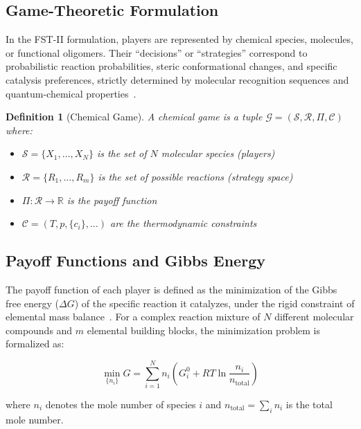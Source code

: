 \documentclass[12pt,a4paper]{article}
\newtheorem{definition}{Definition}
\theoremstyle{remark}
\begin{document}
\subsection{Game-Theoretic Formulation}

In the FST-II formulation, players are represented by chemical species, molecules, or functional oligomers. Their ``decisions'' or ``strategies'' correspond to probabilistic reaction probabilities, steric conformational changes, and specific catalysis preferences, strictly determined by molecular recognition sequences and quantum-chemical properties~\citep{ThermodynamicSelection}.

\begin{definition}[Chemical Game]
A chemical game is a tuple $\mathcal{G} = (\mathcal{S}, \mathcal{R}, \Pi, \mathcal{C})$ where:
\begin{itemize}
    \item $\mathcal{S} = \{X_1, \ldots, X_N\}$ is the set of $N$ molecular species (players)
    \item $\mathcal{R} = \{R_1, \ldots, R_m\}$ is the set of possible reactions (strategy space)
    \item $\Pi: \mathcal{R} \to \mathbb{R}$ is the payoff function
    \item $\mathcal{C} = (T, p, \{c_i\}, \ldots)$ are the thermodynamic constraints
\end{itemize}
\end{definition}

\subsection{Payoff Functions and Gibbs Energy}

The payoff function of each player is defined as the minimization of the Gibbs free energy ($\Delta G$) of the specific reaction it catalyzes, under the rigid constraint of elemental mass balance~\citep{MetabolicNash}. For a complex reaction mixture of $N$ different molecular compounds and $m$ elemental building blocks, the minimization problem is formalized as:

\begin{equation}
\min_{\{n_i\}} G = \sum_{i=1}^{N} n_i \left( G_i^0 + RT \ln\frac{n_i}{n_{\mathrm{total}}} \right)
\end{equation}

\noindent
where $n_i$ denotes the mole number of species $i$ and $n_{\mathrm{total}} = \sum_i n_i$ is the total mole number.
\end{document}
